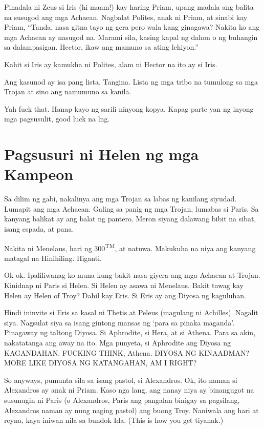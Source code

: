 \documentclass[12pt,letterpaper]{report}
\begin{document}
Pinadala ni Zeus si Iris (hi maam!) kay haring Priam, upang madala ang balita na susugod ang mga Achaean. Nagbalat Polites, anak ni Priam, at sinabi kay Priam, ``Tanda, nasa gitna tayo ng gera pero wala kang ginagawa? Nakita ko ang mga Achaean ay nasugod na. Marami sila, kasing kapal ng dahon o ng buhangin sa dalampasigan. Hector, ikaw ang mamuno sa ating lehiyon.''

Kahit si Iris ay kamukha ni Polites, alam ni Hector na ito ay si Iris.

Ang kasunod ay isa pang lista. Tangina. Lista ng mga tribo na tumulong sa mga Trojan at sino ang namumuno sa kanila.

Yah fuck that. Hanap kayo ng sarili ninyong kopya. Kapag parte yan ng inyong mga pagsusulit, good luck na lng.

\pagebreak
\chapter{Pagsusuri ni Helen ng mga Kampeon}

Sa dilim ng gabi, nakalinya ang mga Trojan sa labas ng kanilang siyudad. Lumapit ang mga Achaean. Galing sa panig ng mga Trojan, lumabas si Paris. Sa kanyang balikat ay ang balat ng pantero. Meron siyang dalawang bibit na sibat, isang espada, at pana.

Nakita ni Menelaus, hari ng 300\textsuperscript{TM}, at natuwa. Makukuha na niya ang kanyang matagal na Hinihiling. Higanti.

Ok ok. Ipaliliwanag ko muna kung bakit nasa giyera ang mga Achaean at Trojan. Kinidnap ni Paris si Helen. Si Helen ay asawa ni Menelaus. Bakit tawag kay Helen ay Helen of Troy? Dahil kay Eris. Si Eris ay ang Diyosa ng kaguluhan.

Hindi ininvite si Eris sa kasal ni Thetis at Peleus (magulang ni Achilles). Nagalit siya. Nagsulat siya sa isang gintong mansas ng `para sa pinaka maganda'. Pinagaway ng taltong Diyosa. Si Aphrodite, si Hera, at si Athena. Para sa akin, nakatatanga ang away na ito. Mga punyeta, si Aphrodite ang Diyosa ng KAGANDAHAN. FUCKING THINK, Athena. DIYOSA NG KINAADMAN? MORE LIKE DIYOSA NG KATANGAHAN, AM I RIGHT?

So anyways, pumunta sila sa isang pastol, si Alexandros. Ok, ito naman si Alexandros ay anak ni Priam. Kaso nga lang, ang nanay niya ay binangugot na susunugin ni Paris (o Alexandros, Paris ang pangalan binigay sa pagsilang, Alexandros naman ay nung naging pastol) ang buong Troy. Naniwala ang hari at reyna, kaya iniwan nila sa bundok Ida. (This is how you get tiyanak.)
\end{document}

